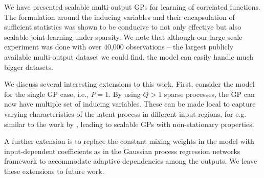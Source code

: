 We have presented scalable multi-output GPs for learning of correlated functions.
The formulation around the inducing variables and their encapsulation of sufficient statistics was shown to be conducive to not only effective but also scalable joint learning under sparsity. 
We note that although our large scale experiment was done with over 40,000 observations -- the largest publicly available multi-output dataset we could find, the model can easily handle much bigger datasets.

We discuss several interesting extensions to this work.
First, consider the model for the single GP case, i.e., $P = 1$. By using $Q > 1$ sparse processes, the GP can now have multiple set of inducing variables.
These can be made local to capture varying characteristics of the latent process in different  input regions, for e.g. similar to the 
work by \citet{nguyen2014fast}, leading to scalable GPs with non-stationary properties. 

A further extension is to replace the constant mixing weights in the model with input-dependent coefficients as in the Gaussian process regression networks framework \citep[GPRN,][]{wilson-et-al-icml-12} to accommodate adaptive dependencies among the outputs.
We leave  these extensions to future work.